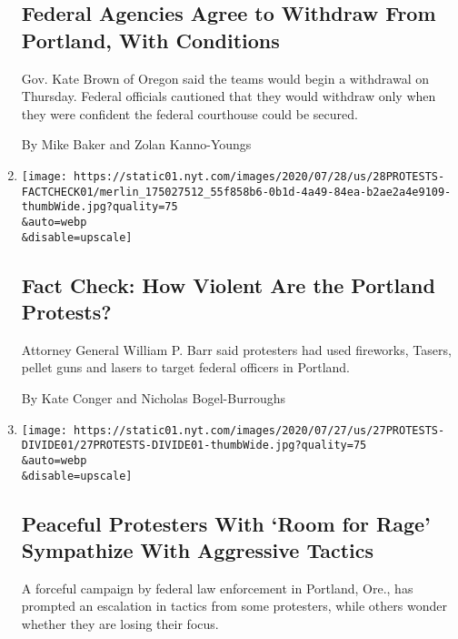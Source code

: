 \begin{enumerate}
  \hypertarget{federal-agencies-agree-to-withdraw-from-portland-with-conditions}{%
  \subsection{Federal Agencies Agree to Withdraw From Portland, With
  Conditions}\label{federal-agencies-agree-to-withdraw-from-portland-with-conditions}}

  Gov. Kate Brown of Oregon said the teams would begin a withdrawal on
  Thursday. Federal officials cautioned that they would withdraw only
  when they were confident the federal courthouse could be secured.

  By Mike Baker and Zolan Kanno-Youngs
\item
  \href{/2020/07/28/us/portland-protests-fact-check.html}{}

  \texttt{[image: https://static01.nyt.com/images/2020/07/28/us/28PROTESTS-FACTCHECK01/merlin\_175027512\_55f858b6-0b1d-4a49-84ea-b2ae2a4e9109-thumbWide.jpg?quality=75\\\&auto=webp\\\&disable=upscale]}

  \hypertarget{fact-check-how-violent-are-the-portland-protests}{%
  \subsection{Fact Check: How Violent Are the Portland
  Protests?}\label{fact-check-how-violent-are-the-portland-protests}}

  Attorney General William P. Barr said protesters had used fireworks,
  Tasers, pellet guns and lasers to target federal officers in Portland.

  By Kate Conger and Nicholas Bogel-Burroughs
\item
  \href{/2020/07/27/us/protests-divisions-blm.html}{}

  \texttt{[image: https://static01.nyt.com/images/2020/07/27/us/27PROTESTS-DIVIDE01/27PROTESTS-DIVIDE01-thumbWide.jpg?quality=75\\\&auto=webp\\\&disable=upscale]}

  \hypertarget{peaceful-protesters-with-room-for-rage-sympathize-with-aggressive-tactics}{%
  \subsection{Peaceful Protesters With `Room for Rage' Sympathize With
  Aggressive
  Tactics}\label{peaceful-protesters-with-room-for-rage-sympathize-with-aggressive-tactics}}

  A forceful campaign by federal law enforcement in Portland, Ore., has
  prompted an escalation in tactics from some protesters, while others
  wonder whether they are losing their focus.


\end{enumerate}
